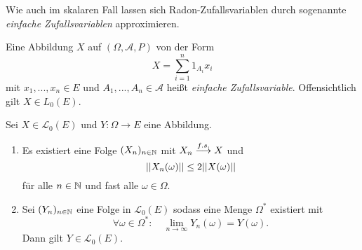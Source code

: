 Wie auch im skalaren Fall lassen sich Radon-Zufallsvariablen durch sogenannte \textit{einfache Zufallsvariablen} approximieren. 

\begin{mydef}
    Eine Abbildung $X$ auf $(\Omega, \mathcal{A}, P)$ von der Form 
    $$
        X = \sum_{i=1}^n 1_{A_i}x_i
    $$
    mit $x_1,...,x_n \in E$ und $A_1,..., A_n \in \mathcal{A}$ heißt \textit{einfache Zufallsvariable}. Offensichtlich gilt $X \in L_0(E)$. 
\end{mydef}


\begin{proposition}
    Sei $X \in \mathcal{L}_0(E)$ und $Y: \Omega \to E$ eine Abbildung. 
    \begin{enumerate}
        \item Es existiert eine Folge $(X_n)_{n \in \mathbb{N}}$ mit $X_n \overset{f.s.}{\longrightarrow} X$ und 
        $$
            \lvert\lvert X_n(\omega) \rvert\rvert \leq 2 \lvert\lvert X(\omega) \rvert\rvert
        $$
        für alle $n \in \mathbb{N}$ und fast alle $\omega \in \Omega$. 
        \item Sei $(Y_n)_{n \in \mathbb{N}}$ eine Folge in $\mathcal{L}_0(E)$ sodass eine Menge $\Omega^*$ existiert mit 
        $$
            \forall \omega \in \Omega^*: \quad \lim_{n \to \infty}Y_n(\omega) = Y(\omega). 
        $$
        Dann gilt $Y \in \mathcal{L}_0(E)$. 
    \end{enumerate}
\end{proposition}

